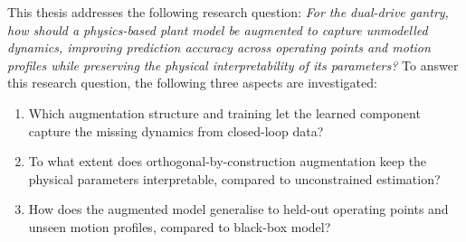 This thesis addresses the following research question:
\textit{For the dual-drive gantry, how should a physics-based plant model
be augmented to capture unmodelled dynamics, improving prediction accuracy
across operating points and motion profiles while preserving the physical
interpretability of its parameters?}
To answer this research question, the following three aspects
are investigated:
\begin{enumerate}
\item Which augmentation structure and
training let the learned component capture the missing dynamics from
closed-loop data?
\item To what
extent does orthogonal-by-construction augmentation keep the physical
parameters interpretable, compared to unconstrained estimation?
\item How does the
augmented model generalise to held-out operating points and unseen motion
profiles, compared to  black-box model?
\end{enumerate}
%
